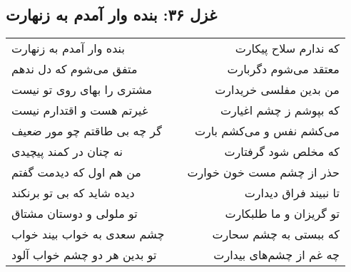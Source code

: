 \begin{center}
\section*{غزل ۳۶: بنده وار آمدم به زنهارت}
\label{sec:036}
\begin{longtable}{l p{0.5cm} r}
بنده وار آمدم به زنهارت
&&
که ندارم سلاح پیکارت
\\
متفق می‌شوم که دل ندهم
&&
معتقد می‌شوم دگربارت
\\
مشتری را بهای روی تو نیست
&&
من بدین مفلسی خریدارت
\\
غیرتم هست و اقتدارم نیست
&&
که بپوشم ز چشم اغیارت
\\
گر چه بی طاقتم چو مور ضعیف
&&
می‌کشم نفس و می‌کشم بارت
\\
نه چنان در کمند پیچیدی
&&
که مخلص شود گرفتارت
\\
من هم اول که دیدمت گفتم
&&
حذر از چشم مست خون خوارت
\\
دیده شاید که بی تو برنکند
&&
تا نبیند فراق دیدارت
\\
تو ملولی و دوستان مشتاق
&&
تو گریزان و ما طلبکارت
\\
چشم سعدی به خواب بیند خواب
&&
که ببستی به چشم سحارت
\\
تو بدین هر دو چشم خواب آلود
&&
چه غم از چشم‌های بیدارت
\\
\end{longtable}
\end{center}
